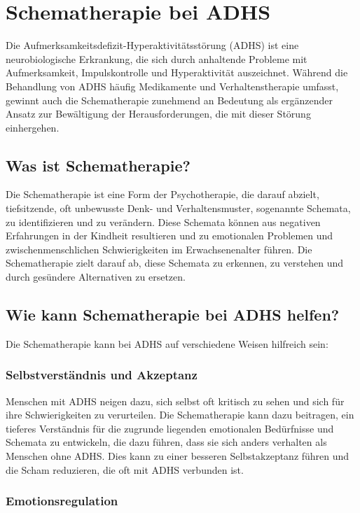 \section{Schematherapie bei ADHS}

Die Aufmerksamkeitsdefizit-Hyperaktivitätsstörung (ADHS) ist eine neurobiologische Erkrankung, die sich durch anhaltende Probleme mit Aufmerksamkeit, Impulskontrolle und Hyperaktivität auszeichnet. Während die Behandlung von ADHS häufig Medikamente und Verhaltenstherapie umfasst, gewinnt auch die Schematherapie zunehmend an Bedeutung als ergänzender Ansatz zur Bewältigung der Herausforderungen, die mit dieser Störung einhergehen.

\subsection{Was ist Schematherapie?}

Die Schematherapie ist eine Form der Psychotherapie, die darauf abzielt, tiefsitzende, oft unbewusste Denk- und Verhaltensmuster, sogenannte Schemata, zu identifizieren und zu verändern. Diese Schemata können aus negativen Erfahrungen in der Kindheit resultieren und zu emotionalen Problemen und zwischenmenschlichen Schwierigkeiten im Erwachsenenalter führen. Die Schematherapie zielt darauf ab, diese Schemata zu erkennen, zu verstehen und durch gesündere Alternativen zu ersetzen.

\subsection{Wie kann Schematherapie bei ADHS helfen?}

Die Schematherapie kann bei ADHS auf verschiedene Weisen hilfreich sein:

\subsubsection{Selbstverständnis und Akzeptanz}

Menschen mit ADHS neigen dazu, sich selbst oft kritisch zu sehen und sich für ihre Schwierigkeiten zu verurteilen. Die Schematherapie kann dazu beitragen, ein tieferes Verständnis für die zugrunde liegenden emotionalen Bedürfnisse und Schemata zu entwickeln, die dazu führen, dass sie sich anders verhalten als Menschen ohne ADHS. Dies kann zu einer besseren Selbstakzeptanz führen und die Scham reduzieren, die oft mit ADHS verbunden ist.

\subsubsection{Emotionsregulation}

